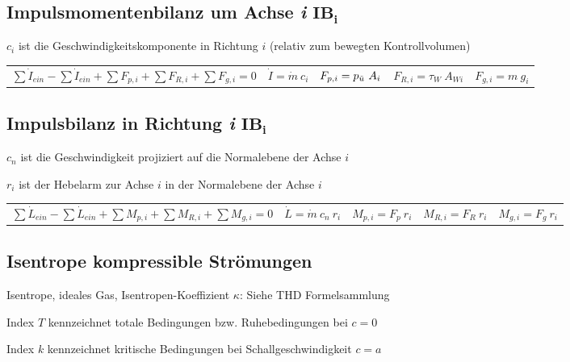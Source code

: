 \subsection{Impulsmomentenbilanz um Achse \textit{i} $\mathbf{IB_i}$ }
	$ c_i $ ist die Geschwindigkeitskomponente in Richtung $ i $ (relativ zum bewegten Kontrollvolumen)
%
	\begin{center}
		\setlength{\tabcolsep}{0.65em} %
		\begin{tabular}{lllll}
			  $ \sum \dot{I}_{ein} - \sum \dot{I}_{ein} + \sum F_{p,i} + \sum F_{R,i} + \sum F_{g,i} = 0$
			& $ \dot{I} = \dot{m} \ c_i $
			& $ F_{p,i} = p_{\ddot{u}} \ A_i $
			& $ F_{R,i} = \tau_W \ A_{Wi} $
			& $ F_{g,i} = m \ g_i $
		\end{tabular}
	\end{center}

\subsection{Impulsbilanz in Richtung \textit{i} $\mathbf{IB_i}$ }
	$ c_n $ ist die Geschwindigkeit projiziert auf die Normalebene der Achse $ i $

	$ r_i $ ist der Hebelarm zur Achse $ i $ in der Normalebene der Achse $ i $
%
	\begin{center}
		\setlength{\tabcolsep}{0.36em} %
		\begin{tabular}{lllll}
			$ \sum \dot{L}_{ein} - \sum \dot{L}_{ein} + \sum M_{p,i} + \sum M_{R,i} + \sum M_{g,i} = 0$
			& $ \dot{L} = \dot{m} \ c_n \ r_i $
			& $ M_{p,i} = F_p\ r_i $
			& $ M_{R,i} = F_R\ r_i $
			& $ M_{g,i} = F_g\ r_i $
		\end{tabular}
	\end{center}

\subsection{Isentrope kompressible Strömungen}
	Isentrope, ideales Gas, Isentropen-Koeffizient $\kappa$: Siehe THD Formelsammlung

	Index $ T $ kennzeichnet totale Bedingungen bzw. Ruhebedingungen bei $ c = 0 $

	Index $ k $ kennzeichnet kritische Bedingungen bei Schallgeschwindigkeit $ c = a $

